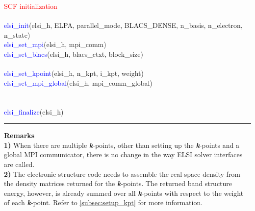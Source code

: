 \documentclass{report}
\begin{document}
\begin{algorithm}[H]
\textcolor{red}{SCF initialization}\\
\hspace{0.3cm}\\
\textcolor{blue}{elsi\_init}(elsi\_h, ELPA, parallel\_mode, BLACS\_DENSE, n\_basis, n\_electron, n\_state)\\
\textcolor{blue}{elsi\_set\_mpi}(elsi\_h, mpi\_comm)\\
\textcolor{blue}{elsi\_set\_blacs}(elsi\_h, blacs\_ctxt, block\_size)\\
\hspace{0.3cm}\\
\textcolor{blue}{elsi\_set\_kpoint}(elsi\_h, n\_kpt, i\_kpt, weight)\\
\textcolor{blue}{elsi\_set\_mpi\_global}(elsi\_h, mpi\_comm\_global)\\
\hspace{0.3cm}\\
\hspace{0.3cm}\\
\textcolor{blue}{elsi\_finalize}(elsi\_h)\\
\end{algorithm}

\noindent\rule{18cm}{0.4pt}

\bigskip
\textbf{Remarks}\\

\textbf{1)} When there are multiple \textbf{\textit{k}}-points, other than setting up the \textbf{\textit{k}}-points and a global MPI communicator, there is no change in the way ELSI solver interfaces are called.\\

\textbf{2)} The electronic structure code needs to assemble the real-space density from the density matrices returned for the \textbf{\textit{k}}-points.  The returned band structure energy, however, is already summed over all \textbf{\textit{k}}-points with respect to the weight of each \textbf{\textit{k}}-point.  Refer to \ref{subsec:setup_kpt} for more information.\\
\end{document}
